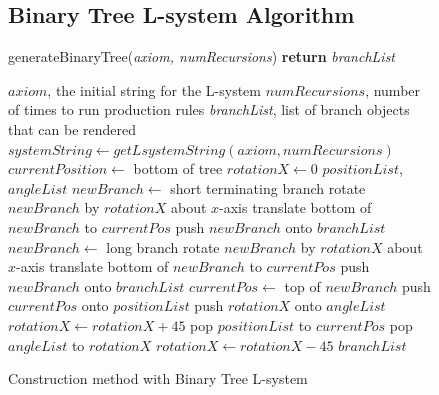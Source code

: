 \documentclass[final]{cmpreport}
\begin{document}
\begin{figure}[ht]
    \subsection{Binary Tree L-system Algorithm}
    \label{app:b-tree-lsystem-algo}
    \begin{algorithm}[H]
    \caption{generateBinaryTree(\emph{axiom, numRecursions}) {\textbf{return}} \emph{branchList}}
        \begin{algorithmic}[1]
        \Require $axiom$, the initial string for the L-system
        \Require $numRecursions$, number of times to run production rules
        \Ensure \emph{branchList}, list of branch objects that can be rendered
        \State $systemString \leftarrow getLsystemString(axiom, numRecursions)$
        \State $currentPosition \leftarrow$ bottom of tree
        \State $rotationX \leftarrow 0$
        \State $positionList$, $angleList$ 
                \State $newBranch \leftarrow$ short terminating branch
                \State rotate $newBranch$ by $rotationX$ about $x$-axis
                \State translate bottom of $newBranch$ to $currentPos$
                \State push $newBranch$ onto $branchList$
                \State $newBranch \leftarrow$ long branch
                \State rotate $newBranch$ by $rotationX$ about $x$-axis
                \State translate bottom of $newBranch$ to $currentPos$
                \State push $newBranch$ onto $branchList$
                \State $currentPos \leftarrow$ top of $newBranch$
            \ElsIf{$character$ = $[$}
                \State push $currentPos$ onto $positionList$
                \State push $rotationX$ onto $angleList$
                \State $rotationX \leftarrow rotationX + 45$
            \ElsIf{$character$ = $]$}
                \State pop $positionList$ to $currentPos$
                \State pop $angleList$ to $rotationX$
                \State $rotationX \leftarrow rotationX - 45$
            \EndIf
        \EndFor
        \State \Return $branchList$
        \end{algorithmic}
    \end{algorithm}
    \caption{Construction method with Binary Tree L-system}
\end{figure}
\end{document}
